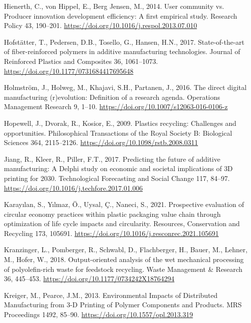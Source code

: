 \documentclass[
  11pt,
]{article}
\newlength{\cslhangindent}
\newlength{\cslentryspacingunit} %
\newenvironment{CSLReferences}[2] %
 {%
  \setlength{\parindent}{0pt}
  \ifodd #1
  \let\oldpar\par
  \def\par{\hangindent=\cslhangindent\oldpar}
  \fi
  \setlength{\parskip}{#2\cslentryspacingunit}
 }%
 {}
\begin{document}
\begin{CSLReferences}{1}{0}
\leavevmode{}%
Hienerth, C., von Hippel, E., Berg Jensen, M., 2014. User community vs.
Producer innovation development efficiency: {A} first empirical study.
Research Policy 43, 190--201.
\url{https://doi.org/10.1016/j.respol.2013.07.010}

\leavevmode{}%
Hofstätter, T., Pedersen, D.B., Tosello, G., Hansen, H.N., 2017.
State-of-the-art of fiber-reinforced polymers in additive manufacturing
technologies. Journal of Reinforced Plastics and Composites 36,
1061--1073. \url{https://doi.org/10.1177/0731684417695648}

\leavevmode{}%
Holmström, J., Holweg, M., Khajavi, S.H., Partanen, J., 2016. The direct
digital manufacturing (r)evolution: Definition of a research agenda.
Operations Management Research 9, 1--10.
\url{https://doi.org/10.1007/s12063-016-0106-z}

\leavevmode{}%
Hopewell, J., Dvorak, R., Kosior, E., 2009. Plastics recycling:
Challenges and opportunities. Philosophical Transactions of the Royal
Society B: Biological Sciences 364, 2115--2126.
\url{https://doi.org/10.1098/rstb.2008.0311}

\leavevmode{}%
Jiang, R., Kleer, R., Piller, F.T., 2017. Predicting the future of
additive manufacturing: {A Delphi} study on economic and societal
implications of {3D} printing for 2030. Technological Forecasting and
Social Change 117, 84--97.
\url{https://doi.org/10.1016/j.techfore.2017.01.006}

\leavevmode{}%
Karayılan, S., Yılmaz, Ö., Uysal, Ç., Naneci, S., 2021. Prospective
evaluation of circular economy practices within plastic packaging value
chain through optimization of life cycle impacts and circularity.
Resources, Conservation and Recycling 173, 105691.
\url{https://doi.org/10.1016/j.resconrec.2021.105691}

\leavevmode{}%
Kranzinger, L., Pomberger, R., Schwabl, D., Flachberger, H., Bauer, M.,
Lehner, M., Hofer, W., 2018. Output-oriented analysis of the wet
mechanical processing of polyolefin-rich waste for feedstock recycling.
Waste Management \& Research 36, 445--453.
\url{https://doi.org/10.1177/0734242X18764294}

\leavevmode{}%
Kreiger, M., Pearce, J.M., 2013. Environmental {Impacts} of {Distributed
Manufacturing} from 3-{D Printing} of {Polymer Components} and
{Products}. MRS Proceedings 1492, 85--90.
\url{https://doi.org/10.1557/opl.2013.319}


\end{CSLReferences}
\end{document}
